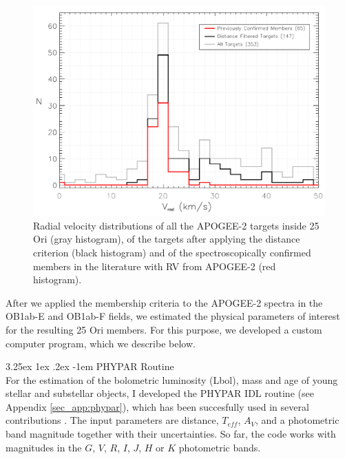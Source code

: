 \documentclass[12pt]{article}
\makeatletter
\newcounter{subsubsubsection}[subsubsection]
\renewcommand\paragraph{\@startsection{paragraph}{5}{\z@}%
  {3.25ex \@plus1ex \@minus.2ex}%
  {-1em}%
  {\normalfont\normalsize\bfseries}}
\makeatother
\begin{document}
\begin{figure}[ht!]
	\centering
	\includegraphics[width=1.\textwidth]{radial_velocity.pdf}
	\caption[Radial velocity distributions of the APOGEE-2 targets and members of 25 Ori.]{Radial velocity distributions of all the APOGEE-2 targets inside 25 Ori (gray histogram), of the targets after applying the distance criterion (black histogram) and of the spectroscopically confirmed members in the literature with RV from APOGEE-2 (red histogram).}
	\label{fig_APOGEE-2:rv}
\end{figure}

\label{sec_APOGEE-2:physical_parameters}
After we applied the membership criteria to the APOGEE-2 spectra in the OB1ab-E and OB1ab-F fields, we estimated the physical parameters of interest for the resulting 25 Ori members. For this purpose, we developed a custom computer program, which we describe below.

\paragraph{PHYPAR Routine\\}
\label{sec_APOGEE-2:phypar}
For the estimation of the bolometric luminosity (\ac{Lbol}), mass and age of young stellar and substellar objects, I developed the PHYPAR IDL routine (see Appendix \ref{sec_app:phypar}), which has been succesfully used in several contributions \citep{Suarez2017,Kounkel2018,Ramirez-Preciado2018}. The input parameters are distance, $T_{eff}$, $A_V$, and a photometric band magnitude together with their uncertainties. So far, the code works with magnitudes in the $G$, $V$, $R$, $I$, $J$, $H$ or $K$ photometric bands.
\end{document}
